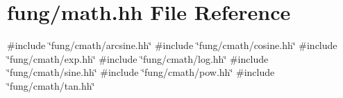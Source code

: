 \hypertarget{math_8hh}{\section{fung/math.hh \-File \-Reference}
\label{math_8hh}
}
{\ttfamily \#include \char`\"{}fung/cmath/arcsine.\-hh\char`\"{}}\*
{\ttfamily \#include \char`\"{}fung/cmath/cosine.\-hh\char`\"{}}\*
{\ttfamily \#include \char`\"{}fung/cmath/exp.\-hh\char`\"{}}\*
{\ttfamily \#include \char`\"{}fung/cmath/log.\-hh\char`\"{}}\*
{\ttfamily \#include \char`\"{}fung/cmath/sine.\-hh\char`\"{}}\*
{\ttfamily \#include \char`\"{}fung/cmath/pow.\-hh\char`\"{}}\*
{\ttfamily \#include \char`\"{}fung/cmath/tan.\-hh\char`\"{}}\*
